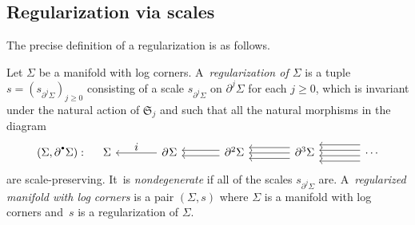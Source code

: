 \documentclass[JEP,XML,SOM,Unicode,NoFloatCountersInSection,published]{cedram}
\let\oldbullet\bullet
\renewcommand{\bullet}{{\raisebox{1pt}{$\scriptscriptstyle\oldbullet$}}}
\let\tst\textstyle
\theoremstyle{definition}
\theoremstyle{remark}
\let\defn\emph
\renewcommand{\ge}{\geqslant}
\newcommand{\Sig}{\Sigma}
\newcommand{\bdSig}[1][]{\partial^{#1}\Sigma}
\newcommand{\symgp}[1]{\mathfrak{S}_{#1}}
\begin{document}
\subsection{Regularization via scales}
The precise definition of a regularization is as follows.

\begin{definition}\label{def:regularization}
Let $\Sig$ be a manifold with log corners. A~\defn{regularization of $\Sig$} is a tuple $s = (s_{\bdSig[j]})_{j \ge 0}$ consisting of a scale $s_{\bdSig[j]}$ on $\bdSig[j]$ for each $j \ge 0$, which is invariant under the natural action of $\symgp{j}$ and such that all the natural morphisms in the diagram\vspace*{-3pt}
\[
\begin{tikzcd}[column sep = .8cm, row sep = 1cm,baseline=-0.9cm]
(\Sig,\bdSig[\bullet]): &[-.5cm] \Sig &[.5cm] \bdSig \ar[l,"\tst i"'] &[.4cm] \bdSig[2] \ar[l,shift left] \ar[l,shift right] &[.5cm] \bdSig[3] \ar[l,shift left = 2]\ar[l,shift left = 0]\ar[l,shift left = -2] &[.5cm] \cdots \ar[l,shift left = 3]\ar[l,shift left = 1]\ar[l,shift left = -1]\ar[l,shift left = -3]
\end{tikzcd}
\]
are scale-preserving. It~is \defn{nondegenerate} if all of the scales $s_{\partial^j\Sig}$ are. A~\defn{regularized manifold with log corners} is a pair $(\Sig,s)$ where $\Sig$ is a manifold with log corners and~$s$ is a regularization of $\Sig$.
\end{definition}
\end{document}
